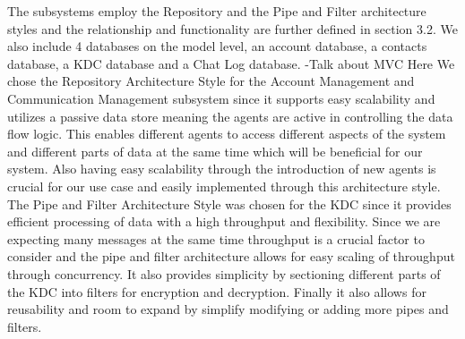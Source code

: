 \documentclass[]{article}
\begin{document}
The subsystems employ the Repository and the Pipe and Filter architecture styles and the relationship and functionality are further defined in section 3.2.
\newline
\newline
We also include 4 databases on the model level, an account database, a contacts database, a KDC database and a Chat Log database.
\newline
\newline
-Talk about MVC Here
\newline
\newline
We chose the Repository Architecture Style for the Account Management and Communication Management subsystem since it supports easy scalability and utilizes a passive data store meaning the agents are active in controlling the data flow logic. This enables different agents to access different aspects of the system and different parts of data at the same time which will be beneficial for our system. Also having easy scalability through the introduction of new agents is crucial for our use case and easily implemented through this architecture style.
\newline
\newline
The Pipe and Filter Architecture Style was chosen for the KDC since it provides efficient processing of data with a high throughput and flexibility. Since we are expecting many messages at the same time throughput is a crucial factor to consider and the pipe and filter architecture allows for easy scaling of throughput through concurrency. It also provides simplicity by sectioning different parts of the KDC into filters for encryption and decryption. Finally it also allows for reusability and room to expand by simplify modifying or adding more pipes and filters.
\end{document}
